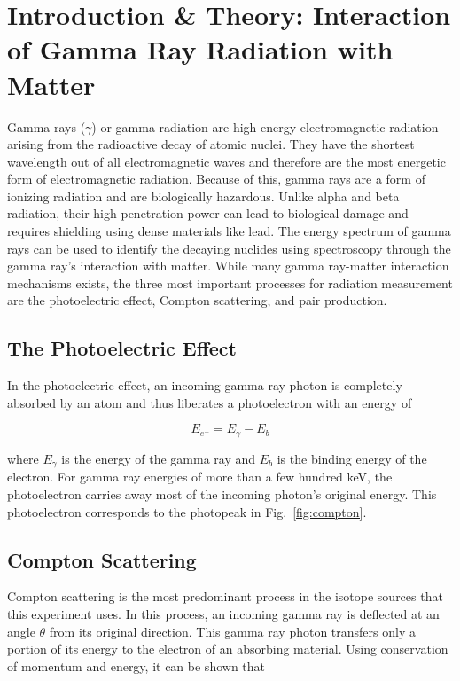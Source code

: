 \documentclass[%
 aip,
rsi,%
 amsmath,amssymb,
 reprint,%
author-numerical,%
]{revtex4-1}
\begin{document}
\section{Introduction \& Theory: Interaction of Gamma Ray Radiation with Matter}
Gamma rays ($\gamma$) or gamma radiation are high energy electromagnetic radiation arising from the radioactive decay of atomic nuclei. They have the shortest wavelength out of all electromagnetic waves and therefore are the most energetic form of electromagnetic radiation. Because of this, gamma rays are a form of ionizing radiation and are biologically hazardous. Unlike alpha and beta radiation, their high penetration power can lead to biological damage and requires shielding using dense materials like lead. \newline
\indent The energy spectrum of gamma rays can be used to identify the decaying nuclides using spectroscopy through the gamma ray's interaction with matter. While many gamma ray-matter interaction mechanisms exists, the three most important processes for radiation measurement are the photoelectric effect, Compton scattering, and pair production.\cite{Knoll} 


\subsection{The Photoelectric Effect}
In the photoelectric effect, an incoming gamma ray photon is completely absorbed by an atom and thus liberates a photoelectron with an energy of 

\begin{equation}
E _ { e ^ { - } } = E_{\gamma} - E _ { b }
\label{eq:one}
\end{equation}

\noindent where $E_{\gamma}$ is the energy of the gamma ray and $E _ { b }$ is the binding energy of the electron. For gamma ray energies of more than a few hundred keV, the photoelectron carries away most of the incoming photon's original energy. This photoelectron corresponds to the photopeak in Fig.~\ref{fig:compton}.


\subsection{Compton Scattering}
Compton scattering is the most predominant process in the isotope sources that this experiment uses. In this process, an incoming gamma ray is deflected at an angle $\theta$ from its original direction. This gamma ray photon transfers only a portion of its energy to the electron of an absorbing material. Using conservation of momentum and energy, it can be shown that
\end{document}
